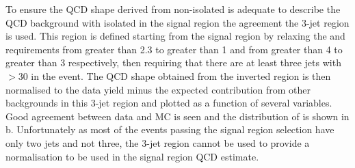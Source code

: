 To ensure the \ac{QCD} shape derived from non-isolated \MET is adequate to describe the \ac{QCD} background with isolated \MET in the signal region the agreement the 3-jet region is used. This region is defined starting from the signal region by relaxing the \jetmetdphi and \METsig requirements from greater than 2.3 to greater than 1 and from greater than 4 to greater than 3 respectively, then requiring that there are at least three jets with \pt$>30$ \GeV in the event. The \ac{QCD} shape obtained from the inverted region is then normalised to the data yield minus the expected contribution from other backgrounds in this 3-jet region and plotted as a function of several variables. Good agreement between data and \ac{MC} is seen and the distribution of \METsig is shown in b. Unfortunately as most of the events passing the signal region selection have only two jets and not three, the 3-jet region cannot be used to provide a normalisation to be used in the signal region \ac{QCD} estimate.

